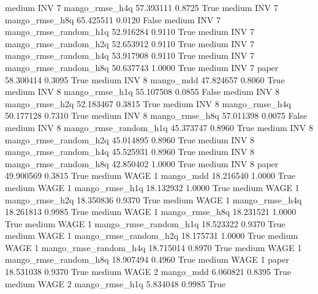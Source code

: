     medium      INV                 7        mango_rmse_h4q  57.393111      0.8725    True
    medium      INV                 7        mango_rmse_h8q  65.425511      0.0120   False
    medium      INV                 7 mango_rmse_random_h1q  52.916284      0.9110    True
    medium      INV                 7 mango_rmse_random_h2q  52.653912      0.9110    True
    medium      INV                 7 mango_rmse_random_h4q  53.917908      0.9110    True
    medium      INV                 7 mango_rmse_random_h8q  50.637743      1.0000    True
    medium      INV                 7                 paper  58.300414      0.3095    True
    medium      INV                 8             mango_mdd  47.824657      0.8060    True
    medium      INV                 8        mango_rmse_h1q  55.107508      0.0855   False
    medium      INV                 8        mango_rmse_h2q  52.183467      0.3815    True
    medium      INV                 8        mango_rmse_h4q  50.177128      0.7310    True
    medium      INV                 8        mango_rmse_h8q  57.011398      0.0075   False
    medium      INV                 8 mango_rmse_random_h1q  45.373747      0.8960    True
    medium      INV                 8 mango_rmse_random_h2q  45.014895      0.8960    True
    medium      INV                 8 mango_rmse_random_h4q  45.525931      0.8960    True
    medium      INV                 8 mango_rmse_random_h8q  42.850402      1.0000    True
    medium      INV                 8                 paper  49.900569      0.3815    True
    medium     WAGE                 1             mango_mdd  18.216540      1.0000    True
    medium     WAGE                 1        mango_rmse_h1q  18.132932      1.0000    True
    medium     WAGE                 1        mango_rmse_h2q  18.350836      0.9370    True
    medium     WAGE                 1        mango_rmse_h4q  18.261813      0.9985    True
    medium     WAGE                 1        mango_rmse_h8q  18.231521      1.0000    True
    medium     WAGE                 1 mango_rmse_random_h1q  18.523322      0.9370    True
    medium     WAGE                 1 mango_rmse_random_h2q  18.175731      1.0000    True
    medium     WAGE                 1 mango_rmse_random_h4q  18.715014      0.8970    True
    medium     WAGE                 1 mango_rmse_random_h8q  18.907494      0.4960    True
    medium     WAGE                 1                 paper  18.531038      0.9370    True
    medium     WAGE                 2             mango_mdd   6.060821      0.8395    True
    medium     WAGE                 2        mango_rmse_h1q   5.834048      0.9985    True
